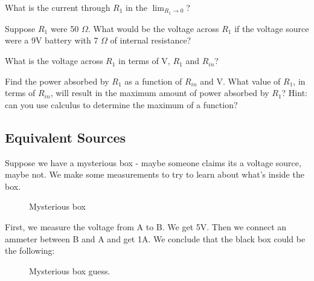 \begin{blevel}
What is the current through $R_1$ in the $\lim_{R_1 \to 0}$? 
\end{blevel}

\begin{blevel}
Suppose $R_1$ were 50 $\Omega$. What would be the voltage across $R_1$ if the voltage source were a 9V battery with 7 $\Omega$ of internal resistance?  
\end{blevel}

\begin{blevel}
What is the voltage across $R_1$ in terms of V, $R_1$ and $R_{in}$? 
\end{blevel}

\begin{clevel}
Find the power absorbed by $R_1$ as a function of $R_{in}$ and V. What value of $R_1$, in terms of $R_{in}$, will result in the maximum amount of power absorbed by $R_1$? Hint: can you use calculus to determine the maximum of a function?
\end{clevel}

\subsection{Equivalent Sources}
Suppose we have a mysterious box - maybe someone claims its a voltage source, maybe not. We make some measurements to try to learn about what's inside the box. 

\begin{figure}[H]
\begin{center}
\caption{Mysterious box}
\end{center}
\end{figure}

First, we measure the voltage from A to B. We get 5V. Then we connect an ammeter between B and A and get 1A. We conclude that the black box could be the following:
\par
\begin{figure}[H]
\begin{center}
\caption{Mysterious box guess.}
\label{F:4TH}
\end{center}
\end{figure}

